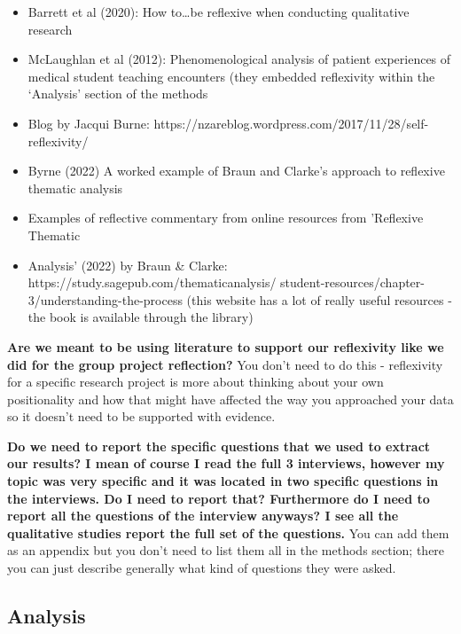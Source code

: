 \documentclass[
  english,
  letterpaper,
  DIV=11,
  numbers=noendperiod]{scrreprt}
\providecommand{\tightlist}{%
  \setlength{\itemsep}{0pt}\setlength{\parskip}{0pt}}
\begin{document}
\begin{itemize}
\tightlist
\item
  Barrett et al (2020): How to\ldots be reflexive when conducting
  qualitative research
\item
  McLaughlan et al (2012): Phenomenological analysis of patient
  experiences of medical student teaching encounters (they embedded
  reflexivity within the `Analysis' section of the methods
\item
  Blog by Jacqui Burne:
  https://nzareblog.wordpress.com/2017/11/28/self-reflexivity/
\item
  Byrne (2022) A worked example of Braun and Clarke's approach to
  reflexive thematic analysis
\item
  Examples of reflective commentary from online resources from
  'Reflexive Thematic
\item
  Analysis' (2022) by Braun \& Clarke:
  https://study.sagepub.com/thematicanalysis/
  student-resources/chapter-3/understanding-the-process (this website
  has a lot of really useful resources - the book is available through
  the library)
\end{itemize}

\textbf{Are we meant to be using literature to support our reflexivity
like we did for the group project reflection?} You don't need to do this
- reflexivity for a specific research project is more about thinking
about your own positionality and how that might have affected the way
you approached your data so it doesn't need to be supported with
evidence.

\textbf{Do we need to report the specific questions that we used to
extract our results? I mean of course I read the full 3 interviews,
however my topic was very specific and it was located in two specific
questions in the interviews. Do I need to report that? Furthermore do I
need to report all the questions of the interview anyways? I see all the
qualitative studies report the full set of the questions.} You can add
them as an appendix but you don't need to list them all in the methods
section; there you can just describe generally what kind of questions
they were asked.

\subsection{Analysis}\label{analysis}
\end{document}
